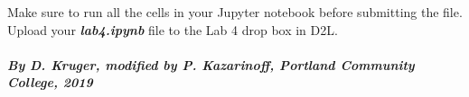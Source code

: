 \documentclass[11pt]{article}
\begin{document}
Make sure to run all the cells in your Jupyter notebook before
submitting the file. Upload your \textbf{\emph{lab4.ipynb}} file to the
Lab 4 drop box in D2L.

    \hypertarget{by-d.-kruger-modified-by-p.-kazarinoff-portland-community-college-2019}{%
\paragraph{\texorpdfstring{\emph{By D. Kruger, modified by P.
Kazarinoff, Portland Community College,
2019}}{By D. Kruger, modified by P. Kazarinoff, Portland Community College, 2019}}\label{by-d.-kruger-modified-by-p.-kazarinoff-portland-community-college-2019}}


    
    
    
    
\end{document}
